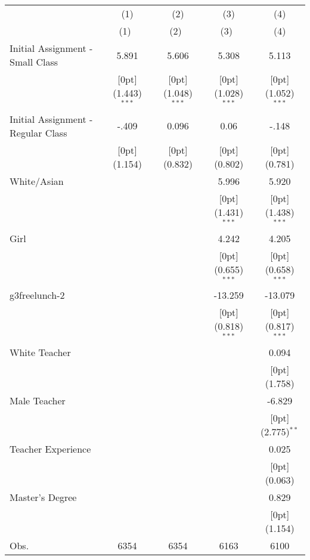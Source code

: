 \begin{tabular*}{\textwidth}{@{\extracolsep{\fill}}lcccc}				
	& \multicolumn{1}{c}{(1)} &	\multicolumn{1}{c}{(2)} &	\multicolumn{1}{c}{(3)} &	\multicolumn{1}{c}{(4)} \\
\cline{2-5}				
	& \multicolumn{1}{c}{(1)\mbox{\ }} &	\multicolumn{1}{c}{(2)\mbox{\ }} &	\multicolumn{1}{c}{(3)\mbox{\ }} &	\multicolumn{1}{c}{(4)} \\
\hline				
Initial Assignment - Small Class &	5.891 &	5.606 &	5.308 &	5.113 \\
&	\raisebox{.7ex}[0pt]{\scriptsize (1.443)$^{***}$} &	\raisebox{.7ex}[0pt]{\scriptsize (1.048)$^{***}$} &	\raisebox{.7ex}[0pt]{\scriptsize (1.028)$^{***}$} &	\raisebox{.7ex}[0pt]{\scriptsize (1.052)$^{***}$} \\
Initial Assignment - Regular Class &	-.409 &	0.096 &	0.06 &	-.148 \\
&	\raisebox{.7ex}[0pt]{\scriptsize (1.154)} &	\raisebox{.7ex}[0pt]{\scriptsize (0.832)} &	\raisebox{.7ex}[0pt]{\scriptsize (0.802)} &	\raisebox{.7ex}[0pt]{\scriptsize (0.781)} \\
White/Asian &	&	&	5.996 &	5.920 \\
&	&	&	\raisebox{.7ex}[0pt]{\scriptsize (1.431)$^{***}$} &	\raisebox{.7ex}[0pt]{\scriptsize (1.438)$^{***}$} \\
Girl &	&	&	4.242 &	4.205 \\
&	&	&	\raisebox{.7ex}[0pt]{\scriptsize (0.655)$^{***}$} &	\raisebox{.7ex}[0pt]{\scriptsize (0.658)$^{***}$} \\
g3freelunch-2 &	&	&	-13.259 &	-13.079 \\
&	&	&	\raisebox{.7ex}[0pt]{\scriptsize (0.818)$^{***}$} &	\raisebox{.7ex}[0pt]{\scriptsize (0.817)$^{***}$} \\
White Teacher &	&	&	&	0.094 \\
&	&	&	&	\raisebox{.7ex}[0pt]{\scriptsize (1.758)} \\
Male Teacher &	&	&	&	-6.829 \\
&	&	&	&	\raisebox{.7ex}[0pt]{\scriptsize (2.775)$^{**}$} \\
Teacher Experience &	&	&	&	0.025 \\
&	&	&	&	\raisebox{.7ex}[0pt]{\scriptsize (0.063)} \\
Master's Degree &	&	&	&	0.829 \\
&	&	&	&	\raisebox{.7ex}[0pt]{\scriptsize (1.154)} \\
Obs. &	6354 &	6354 &	6163 &	6100 \\
\hline\hline				
\end{tabular*}%
